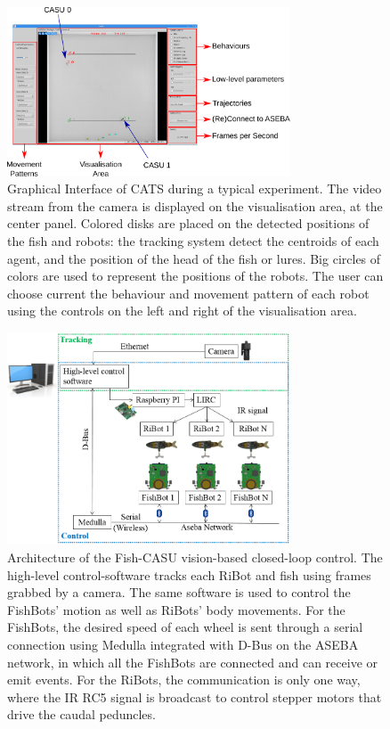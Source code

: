 \documentclass{styles/assisi}
\begin{document}
\begin{figure}[ht]
\centering
\includegraphics[width=0.75\textwidth]{./figs/GUI-desc}
\caption{Graphical Interface of CATS during a typical experiment. The video stream from the camera is displayed on the visualisation area, at the center panel. Colored disks are placed
on the detected positions of the fish and robots: the tracking system detect the centroids of each agent, and the position of the head of the fish or lures. Big circles of colors are used to represent the positions of the robots. The user can choose current the behaviour and movement pattern of each robot using the controls on the left and right of the visualisation area.}
\label{fig:GUI-desc}
\end{figure}

\begin{figure}[ht]
\centering
\includegraphics[width=0.75\textwidth]{./figs/ControlArchitecture}
\caption{Architecture of the Fish-CASU vision-based closed-loop control. The high-level control-software tracks each RiBot and fish using frames grabbed by a camera. The same software
is used to control the FishBots' motion as well as RiBots' body movements. For the FishBots, the desired speed of each wheel is sent through a serial connection using Medulla integrated with D-Bus on the ASEBA network, in which all the FishBots are connected and can receive or emit events. For the RiBots, the communication is only one way, where the IR RC5 signal is broadcast to control stepper motors that drive the caudal peduncles.}
\label{fig:ControlArchitecture}
\end{figure}
\end{document}
